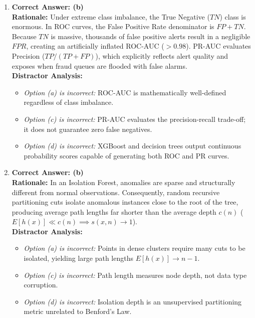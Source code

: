 \begin{enumerate}[label=\textbf{MCQ 9.\arabic*}]
    \item \textbf{Correct Answer: (b)}\\
    \textbf{Rationale:} Under extreme class imbalance, the True Negative ($TN$) class is enormous. In ROC curves, the False Positive Rate denominator is $FP + TN$. Because $TN$ is massive, thousands of false positive alerts result in a negligible $FPR$, creating an artificially inflated ROC-AUC ($> 0.98$). PR-AUC evaluates Precision ($TP / (TP + FP)$), which explicitly reflects alert quality and exposes when fraud queues are flooded with false alarms.\\
    \textbf{Distractor Analysis:}
    \begin{itemize}
        \item \textit{Option (a) is incorrect:} ROC-AUC is mathematically well-defined regardless of class imbalance.
        \item \textit{Option (c) is incorrect:} PR-AUC evaluates the precision-recall trade-off; it does not guarantee zero false negatives.
        \item \textit{Option (d) is incorrect:} XGBoost and decision trees output continuous probability scores capable of generating both ROC and PR curves.
    \end{itemize}

    \item \textbf{Correct Answer: (b)}\\
    \textbf{Rationale:} In an Isolation Forest, anomalies are sparse and structurally different from normal observations. Consequently, random recursive partitioning cuts isolate anomalous instances close to the root of the tree, producing average path lengths far shorter than the average depth $c(n)$ ($E[h(x)] \ll c(n) \implies s(x, n) \to 1$).\\
    \textbf{Distractor Analysis:}
    \begin{itemize}
        \item \textit{Option (a) is incorrect:} Points in dense clusters require many cuts to be isolated, yielding large path lengths $E[h(x)] \to n-1$.
        \item \textit{Option (c) is incorrect:} Path length measures node depth, not data type corruption.
        \item \textit{Option (d) is incorrect:} Isolation depth is an unsupervised partitioning metric unrelated to Benford's Law.
    \end{itemize}
\end{enumerate}

